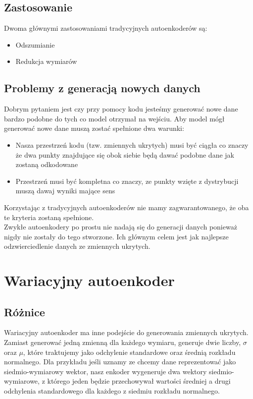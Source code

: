 \documentclass[a4paper,12pt]{book} %
\begin{document}
\subsection{Zastosowanie}
Dwoma głównymi zastosowaniami tradycyjnych autoenkoderów są:
\begin{itemize}
	\item Odszumianie
	\item Redukcja wymiarów 
\end{itemize}
\subsection{Problemy z generacją nowych danych}
Dobrym pytaniem jest czy przy pomocy kodu jesteśmy generować nowe dane bardzo podobne do tych co model otrzymał na wejściu. Aby model mógł generować nowe dane muszą zostać spełnione dwa warunki:
\begin{itemize}
	\item Nasza przestrzeń kodu (tzw. zmiennych ukrytych) musi być ciągła co znaczy że dwa punkty znajdujące się obok siebie będą dawać podobne dane jak zostaną odkodowane
	\item Przestrzeń musi być kompletna co znaczy, ze punkty wzięte z dystrybucji muszą dawaj wyniki mające sens
\end{itemize}
Korzystając z tradycyjnych autoenkoderów nie mamy zagwarantowanego, że oba te kryteria zostaną spełnione.\\

Zwykłe autoenkodery po prostu nie nadają się do generacji danych ponieważ nigdy nie zostały do tego stworzone. Ich głównym celem jest jak najlepsze odzwierciedlenie danych ze zmiennych ukrytych. 
\section{Wariacyjny autoenkoder}
\subsection{Różnice}
Wariacyjny autoenkoder ma inne podejście do generowania zmiennych ukrytych. Zamiast generować jedną zmienną dla każdego wymiaru, generuje dwie liczby, $\sigma$ oraz $\mu$, które traktujemy jako odchylenie standardowe oraz średnią rozkładu normalnego.
Dla przykładu jeśli uznamy ze chcemy dane reprezentować jako siedmio-wymiarowy wektor, nasz enkoder wygeneruje dwa wektory siedmio-wymiarowe, z którego jeden będzie przechowywał wartości średniej a drugi odchylenia standardowego dla każdego z siedmiu rozkładu normalnego.\\
\lipsum[1-2]
\end{document}
